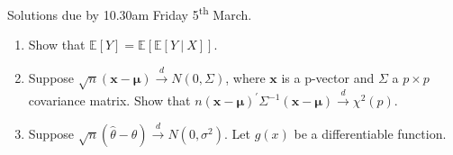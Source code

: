 \documentclass[12pt]{article}
\newif\ifsln
\newcommand{\E}{\mathbb{E}}
\renewcommand{\P}{\mathbb{P}}
\begin{document}
\pagestyle{fancyplain}


\chead{\textbf{Tutorial 4 \ifsln Solutions \fi}}

\begin{center}
Solutions due by 10.30am Friday 5\textsuperscript{th} March.
\end{center}

\begin{enumerate}[1.]
\setlength\itemsep{5mm}
\item Show that $\E[Y] = \E[ \E[Y \ | \ X ] ]$.

\ifsln
\textit{Solution:}\\

\begin{align*}
\E[ \E[Y\ | \ X]] & = \E\left[ \sum_{y} y \P(Y \ | \ X) \right]\\
&= \sum_{x} \left[  \sum_{y} y \P(Y \ | \ X)\right] \P(X) \\
&= \sum_{x} \left[  \sum_{y} y \P(Y, X)\right] \\
&= \sum_{y} y\left[  \sum_{x}  \P(Y, X)\right] \\
&= \sum_{y} y\P(Y) \\
&= \E[Y]
\end{align*}
\fi

\item Suppose $\sqrt{n} (\mathbf{x} -\mathbf{\mu}) \overset{d}{\to} N(0, \Sigma)$, where $\mathbf{x}$ is a p-vector and $\Sigma$ a $p\times p$ covariance matrix. Show that $n (\mathbf{x} -\mathbf{\mu})^{\prime} \Sigma^{-1} (\mathbf{x} -\mathbf{\mu}) \overset{d}{\to} \chi^{2}(p)$.

\ifsln
\textit{Solution:}\\
Must assume positive definiteness. By Cholesky decomposition, $\Sigma^{-1} = C^{\prime}C$. The quadratic form becomes $v^{\prime} v$ where $v = C \sqrt{n}(\bar{X} - \mu) \sim N(0, C \Sigma C^{\prime})$. The variance term reduces to $C\Sigma C^{\prime} = C (C^{\prime} C)^{-1} C^{\prime} = C (C^{-1} C^{\prime^{-1}}) C^{\prime} = (C C^{-1}) (C^{\prime^{-1}} C^{\prime}) = I$. Therefore $v^{\prime}v \sim \chi^{2}(p)$.
\fi


\item Suppose $\sqrt{n}(\hat{\theta} - \theta) \overset{d}{\to} N(0, \sigma^{2})$. Let $g(x)$ be a differentiable function.


\end{enumerate}
\end{document}
